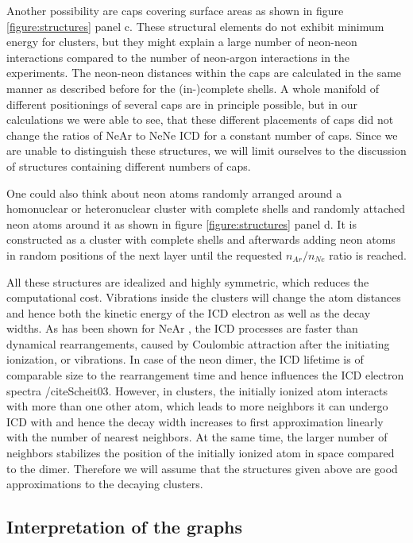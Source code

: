 Another possibility are caps covering surface areas as shown
in figure \ref{figure:structures} panel c. These structural elements
do not exhibit minimum energy for clusters, but they might explain a
large number of neon-neon interactions compared to the number of
neon-argon interactions in the experiments.
The neon-neon distances within the caps are
calculated in the same
manner as described before for the (in-)complete shells.
A whole manifold of different positionings of several caps are in principle
possible, but in our calculations we were able to see, that these different
placements of caps did not change the ratios of NeAr to NeNe ICD for a
constant number of caps. Since we
are unable to distinguish these structures, we will limit ourselves to the
discussion of structures containing different numbers of caps.

One could also think about neon atoms randomly arranged around a homonuclear
or heteronuclear cluster with complete shells and randomly attached neon
atoms around it as shown in figure \ref{figure:structures} panel d.
It is constructed as a cluster with complete shells and afterwards adding
neon atoms in random positions of the next layer until the requested
$n_{Ar}/n_{Ne}$ ratio is reached.

All these structures are idealized and highly symmetric, which reduces
the computational cost. Vibrations inside the clusters will change the atom
distances and hence both the kinetic energy of the ICD electron as well as
the decay widths. As has been shown for NeAr \cite{Scheit06}, the ICD processes
are faster than dynamical rearrangements, caused by Coulombic attraction
after the initiating ionization, or vibrations. In case of the neon dimer, the
ICD lifetime is of comparable size to the rearrangement time and hence
influences the ICD electron spectra /cite{Scheit03}. However, in clusters, the
initially ionized atom interacts with more than one other atom, which leads
to more neighbors it can undergo ICD with and hence the decay width increases
to first approximation linearly with the number of nearest neighbors.
At the same time, the larger number of neighbors stabilizes the position
of the initially ionized atom in space compared to the dimer.
Therefore we will assume that the structures given above are good
approximations to the decaying clusters.




\subsection{Interpretation of the graphs}

